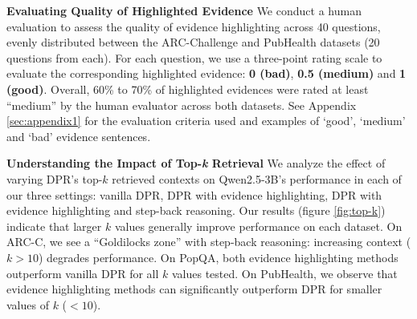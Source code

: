 \textbf{Evaluating Quality of Highlighted Evidence}
We conduct a human evaluation to assess the quality of evidence highlighting across 40 questions, evenly distributed between the ARC-Challenge and PubHealth datasets (20 questions from each). For each question, we use a three-point rating scale to evaluate the corresponding highlighted evidence: \textbf{0 (bad)}, \textbf{0.5 (medium)} and \textbf{1 (good)}. Overall, 60\% to 70\%  of highlighted evidences were rated at least ``medium'' by the human evaluator across both datasets. See Appendix \ref{sec:appendix1} for the evaluation criteria used and examples of `good', `medium' and `bad' evidence sentences.

\textbf{Understanding the Impact of Top-\textit{k} Retrieval}
We analyze the effect of varying DPR's top-$k$ retrieved contexts on Qwen2.5-3B's performance in each of our three settings: vanilla DPR, DPR with evidence highlighting, DPR with evidence highlighting and step-back reasoning. Our results (figure \ref{fig:top-k}) indicate that larger $k$ values generally improve performance on each dataset. On ARC-C, we see a ``Goldilocks zone'' with step-back reasoning: increasing context ($k>10$) degrades performance. On PopQA, both evidence highlighting methods outperform vanilla DPR for all $k$ values tested. On PubHealth, we observe that evidence highlighting methods can significantly outperform DPR for smaller values of $k$ ($<10$).
